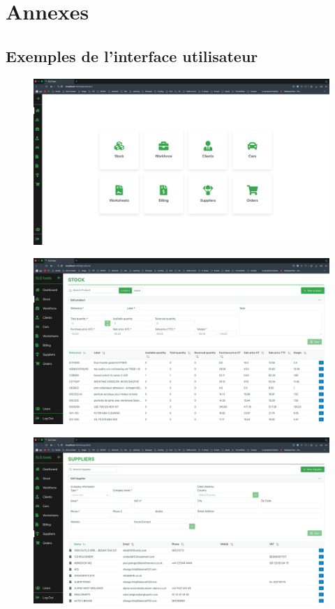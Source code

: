 \documentclass[french, 12pt, a4paper]{article}
\begin{document}
\section*{Annexes}

\subsection*{Exemples de l'interface utilisateur}

\begin{figure}[H]
  \centering
  \includegraphics[width=1.35\textwidth, angle=90]{../img/UI/dash.png}
\end{figure}
\begin{figure}
  \centering
  \includegraphics[width=\textwidth]{../img/UI/stock.png}
\end{figure}
\begin{figure}
  \centering
  \includegraphics[width=\textwidth]{../img/UI/suppliers.png}
\end{figure}
\end{document}
